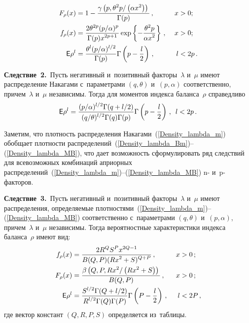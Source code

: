 \begin{multicols}{2}
\noindent
\begin{alignat*}{2}
F_\rho(x)&=1-\fr{\gamma\left(p, \theta^2p/\left(\alpha x^2\right)\right)}{\Gamma(p)}\,,&\  x&>0;\\
f_\rho(x)&=\fr{2\theta^{2p}(p/\alpha)^p}{\Gamma(p) x^{2p+1}}\exp\left\{-
\fr{\theta^2 p}{\alpha x^2}\right\}\,,&\  x&>0;\\
{\sf E}\rho^l&=\fr{\theta^l(p/\alpha)^{l/2}}{\Gamma(p)}\Gamma\left(p-\fr{l}{2}\right)\,,&\  l&<2p\,.
\end{alignat*}


\noindent
\textbf{Следствие~2.}\
Пусть негативный и~позитивный факторы~$\lambda$ и~$\mu$ имеют распределение 
Накагами с~параметрами $(q, \theta)$ и~$(p, \alpha)$ соответственно, причем~$\lambda$ 
и~$\mu$ независимы. Тогда для моментов индекса баланса~$\rho$ справедливо
$$
{\sf E}\rho^l=\displaystyle\frac{\displaystyle (p/\alpha)^{l/2}\Gamma(q+l/2)\mathstrut}{\displaystyle (q/\theta)^{l/2}\Gamma(q)\Gamma(p)\mathstrut}\Gamma\left(p-\displaystyle\frac{\displaystyle l\mathstrut}{\displaystyle 2\mathstrut}\right)\,,\enskip l<2p\,.
$$


\smallskip

Заметим, что плотность распределения Накагами~(\ref{Density_lambda_m}) обобщает 
плот\-ности распределений~(\ref{Density_lambda_Bm})--(\ref{Density_lambda_MB}), 
что дает возможность сформулировать ряд следствий для всевозможных комбинаций 
априорных распределений~(\ref{Density_lambda_m})--(\ref{Density_lambda_MB}) 
n- и~p-фак\-то\-ров.

\smallskip

\noindent
\textbf{Следствие~3.}\
Пусть негативный и~позитивный факторы~$\lambda$ и~$\mu$ 
имеют распределения, определяемые 
плотностями~(\ref{Density_lambda_m})--(\ref{Density_lambda_MB}) 
соответственно с~параметрами $(q, \theta)$ и~$(p, \alpha)$, 
причем~$\lambda$ и~$\mu$ независимы. Тогда вероятностные характеристики 
индекса баланса~$\rho$ имеют вид:
\begin{alignat*}{2}
f_\rho(x)&=\fr{2R^QS^P x^{2Q-1}}{B(Q,P) (R x^2+S)^{Q+P}}\,,&\ x&>0\,;\\
F_\rho(x)&=\fr{\beta\left(Q,P,Rx^2/\left(Rx^2+S\right)\right)}{B(Q,P)}\,,&\  x&>0\,;\\
{\sf E}\rho^l&=\fr{S^{l/2}\Gamma(Q+l/2)}{R^{l/2}\Gamma(Q)\Gamma(P)}\Gamma
\left(P-\fr{l}{2}\right)\,,&\ 
l&<2P\,,
\end{alignat*}
где вектор констант $(Q,R,P,S)$ определяется из~таб\-лицы.


\begin{table*}\small
\begin{center}



\end{center}
\end{table*}
\end{multicols}
